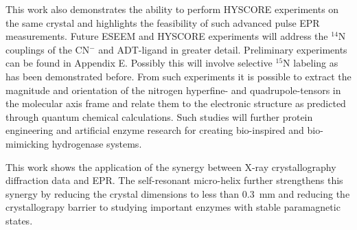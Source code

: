 This work also demonstrates the ability to perform HYSCORE experiments on the same crystal and highlights the feasibility of such advanced pulse EPR measurements. Future ESEEM and HYSCORE experiments will address the $^{14}$N couplings of the CN$^-$ and ADT-ligand in greater detail. Preliminary experiments can be found in Appendix E. Possibly this will involve selective $^{15}$N labeling as has been demonstrated before. \cite{Adamska2015,AdamskaBridgingAmine} From such experiments it is possible to extract the magnitude and orientation of the nitrogen hyperfine- and quadrupole-tensors in the molecular axis frame and relate them to the electronic structure as predicted through quantum chemical calculations. Such studies will further protein engineering and artificial enzyme research for creating bio-inspired and bio-mimicking hydrogenase systems. \cite{C7SE00582B}

This work shows the application of the synergy between X-ray crystallography diffraction data and EPR. The self-resonant micro-helix further strengthens this synergy by reducing the crystal dimensions to less than 0.3~mm and reducing the crystallograpy barrier to studying important enzymes with stable paramagnetic states.


{\renewcommand{\bibsection}{\clearpage\section*{\bibname}\markboth{\bibname}{\bibname}}
\renewcommand{\bibname}{CHAPTER 6. REFERENCES}


}
